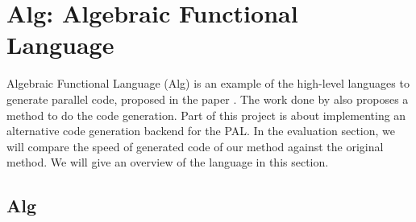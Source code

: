 \chapter{Alg: Algebraic Functional Language}
Algebraic Functional Language (Alg) is an example of the high-level languages to generate parallel code, proposed in the paper \cite{AlgebraicMultipartyProtocol}. The work done by \cite{AlgebraicMultipartyProtocol} also proposes a method to do the code generation. Part of this project is about implementing an alternative code generation backend for the PAL. In the evaluation section, we will compare the speed of generated code of our method against the original method. We will give an overview of the language in this section.  
\section{Alg}
